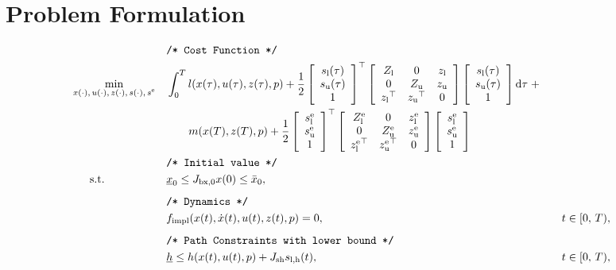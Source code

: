 \documentclass{article}
\newcommand{\tran}{^\top}
\newcommand{\ind}[1]{_{\textrm{#1}}}
\newcommand{\terminal}{^{\textrm{e}}}
\newcommand{\matr}[2]{\left[\begin{array}{#1}#2\end{array}\right]}
\newcommand{\Lower}{\ind{l}}
\newcommand{\lowerh}{\ind{l,h}}
\newcommand{\upper}{\ind{u}}
\newcommand{\mathComment}[1]{\texttt{/* #1 */}}
\begin{document}
	

	
\section*{Problem Formulation}
	
\begin{align*}
	&&&\mathComment{Cost Function}\\
	&\underset{\begin{subarray}{c}
		x(\cdot),\,u(\cdot), \, z(\cdot), \, s(\cdot), \, s\terminal
		\end{subarray}}{\min}
	&&\int_0^T l(x(\tau), u(\tau), z(\tau), p)
	 + \frac{1}{2} \matr{c}{s\Lower(\tau) \\ s\upper(\tau) \\ 1} \tran
	  \matr{ccc} { Z\Lower & 0 & z\Lower \\
	  0 & Z\upper & z\upper \\
		{z\Lower}\tran & {z\upper}\tran & 0}
	\matr{c}{s\Lower(\tau) \\ s\upper(\tau) \\ 1} \mathrm{d}\tau \; + \\
	 &&& \quad \quad m(x(T), z(T), p) +
	  \frac{1}{2} \matr{c}{s\Lower\terminal \\ s\upper\terminal \\ 1} \tran
	 \matr{ccc} { Z\Lower\terminal & 0 & z\Lower\terminal \\
	 	0 & Z\upper\terminal & z\upper\terminal \\
	 	{z\Lower\terminal}\tran & {z\upper\terminal}\tran & 0}
	 \matr{c}{s\Lower\terminal \\ s\upper\terminal \\ 1}
	 \\
	&&&\mathComment{Initial value}\\
	&\,\,\,\quad \text{s.t.}    &&\underline{x}_0 \leq J_{\textrm{bx},0}  x(0) \leq \bar{x}_0 , &&\\
	&&& && \\[-1em]
	&&&\mathComment{Dynamics}\\
	&&& f\ind{impl}(x(t), \dot{x}(t), u(t), z(t), p) = 0, &&\quad t \in [0,\,T),\\
	&&& && \\[-1em]
	&&&\mathComment{Path Constraints with lower bound}\\
	&&&\underline{h} \leq h(x(t), u(t), p) + J_{\textrm{sh}} s\lowerh(t), &&\quad t \in [0,\,T),\\

\end{align*}
\end{document}
